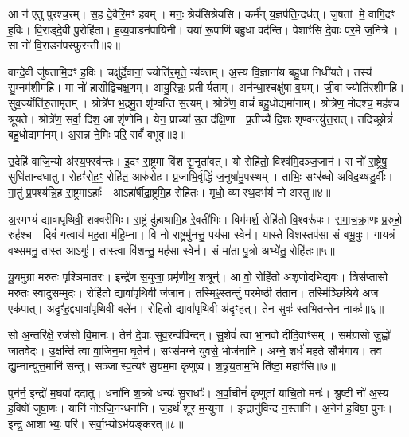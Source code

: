 आ न॑ एतु पुरश्च॒रम्।
स॒ह दे॒वैरि॒मꣳ हवम्।
मनः॒ श्रेय॑सिश्रेयसि।
कर्म॑न् य॒ज्ञप॑ति॒न्दध॑त्।
जु॒षतां मे॒ वागि॒दꣳ ह॒विः।
वि॒राड्दे॒वी पु॒रोहि॑ता।
ह॒व्य॒वाडन॑पायिनी।
यया॑ रू॒पाणि॑ बहु॒धा वद॑न्ति।
पेशाꣳ॑सि दे॒वाः प॑र॒मे ज॒नित्रे।
सा नो॑ वि॒राडन॑पस्फुरन्ती॥२॥

वाग्दे॒वी जु॑षतामि॒दꣳ ह॒विः।
चक्षु॑र्दे॒वानां॒ ज्योति॑र॒मृते॒ न्य॑क्तम्।
अ॒स्य वि॒ज्ञाना॑य बहु॒धा निधी॑यते।
तस्य॑ सु॒म्नम॑शीमहि।
मा नो॑ हासीद्विचक्ष॒णम्।
आयु॒रिन्नः॒ प्रतीर्यताम्।
अन॑न्धा॒श्चक्षु॑षा व॒यम्।
जी॒वा ज्योति॑रशीमहि।
सुव॒र्ज्योति॑रु॒तामृतम्।
श्रोत्रे॑ण भ॒द्रमु॒त शृ॑ण्वन्ति स॒त्यम्।
श्रोत्रे॑ण॒ वाचं॑ बहु॒धोद्यमा॑नाम्।
श्रोत्रे॑ण॒ मोद॑श्च॒ मह॑श्च श्रूयते।
श्रोत्रे॑ण॒ सर्वा॒ दिश॒ आ शृ॑णोमि।
येन॒ प्राच्या॑ उ॒त द॑क्षि॒णा।
प्र॒तीच्यै॑ दि॒शः शृ॒ण्वन्त्यु॑त्त॒रात्।
तदिच्छ्रोत्रं॑ बहु॒धोद्यमा॑नम्।
अ॒रान्न ने॒मिः परि॒ सर्वं॑ बभूव॥३॥\anuvakamend[अ॒ग्रि॒यमन॑पस्फुरन्ती स॒त्यꣳ स॒प्त च॑]

उ॒देहि॑ वाजि॒न्यो अ॑स्य॒फ्स्व॑न्तः।
इ॒दꣳ रा॒ष्ट्रमा वि॑श सू॒नृता॑वत्।
यो रोहि॑तो॒ विश्व॑मि॒दञ्ज॒जान॑।
स नो॑ रा॒ष्ट्रेषु॒ सुधि॑तान्दधातु।
रोहꣳ॑रोह॒ꣳ॒ रोहि॑त॒ आरु॑रोह।
प्र॒जाभि॒र्वृद्धिं॑ ज॒नुषा॑मु॒पस्थम्।
ताभिः॒ सꣳर॑ब्धो अविद॒थ्षडु॒र्वीः।
गा॒तुं प्र॒पश्य॑न्नि॒ह रा॒ष्ट्रमा\-ऽहाः᳚।
आऽहा॑र्\mbox{}षीद्रा॒ष्ट्रमि॒ह रोहि॑तः।
मृधो॒ व्यास्थ॒दभ॑यं नो अस्तु॥४॥

अ॒स्मभ्यं॑ द्यावापृथिवी॒ शक्व॑रीभिः।
रा॒ष्ट्रं दु॑हाथामि॒ह रे॒वती॑भिः।
विम॑मर्\mbox{}श॒ रोहि॑तो वि॒श्वरू॑पः।
स॒मा॒च॒क्रा॒णः प्र॒रुहो॒ रुह॑श्च।
दिवं॑ ग॒त्वाय॑ मह॒ता म॑हि॒म्ना।
वि नो॑ रा॒ष्ट्रमु॑नत्तु॒ पय॑सा॒ स्वेन॑।
यास्ते॒ विश॒स्तप॑सा सं बभू॒वुः।
गा॒य॒त्रं व॒थ्समनु॒ तास्त॒ आऽगुः॑।
तास्त्वा वि॑शन्तु॒ मह॑सा॒ स्वेन॑।
सं मा॑ता पु॒त्रो अ॒भ्ये॑तु॒ रोहि॑तः॥५॥

यू॒यमु॑ग्रा मरुतः पृश्ञिमातरः।
इन्द्रे॑ण स॒युजा॒ प्रमृ॑णीथ॒ शत्रून्॑।
आ वो॒ रोहि॑तो अशृणोदभिद्यवः।
त्रिस॑प्तासो मरुतः स्वादुसम्मुदः।
रोहि॑तो॒ द्यावा॑पृथि॒वी ज॑जान।
तस्मि॒ꣴ॒स्तन्तुं॑ परमे॒ष्ठी त॑तान।
तस्मि॑ञ्छिश्रिये अ॒ज एक॑पात्।
अदृꣳ॑ह॒द्द्यावा॑पृथि॒वी बले॑न।
रोहि॑तो॒ द्यावा॑पृथि॒वी अ॑दृꣳहत्।
तेन॒ सुवः॑ स्तभि॒तन्तेन॒ नाकः॑॥६॥

सो अ॒न्तरि॑क्षे॒ रज॑सो वि॒मानः॑।
तेन॑ दे॒वाः सुव॒रन्व॑विन्दन्।
सु॒शेवं॑ त्वा भा॒नवो॑ दीदि॒वाꣳसम्।
सम॑ग्रासो जु॒ह्वो॑ जातवेदः।
उ॒क्षन्ति॑ त्वा वा॒जिन॒मा घृ॒तेन॑।
सꣳस॑मग्ने युवसे॒ भोज॑नानि।
अग्ने॒ शर्ध॑ मह॒ते सौभ॑गाय।
तव॑ द्यु॒म्नान्यु॑त्त॒मानि॑ सन्तु।
सञ्जास्प॒त्यꣳ सु॒यम॒मा कृ॑णुष्व।
श॒त्रू॒य॒ताम॒भि ति॑ष्ठा॒ महाꣳ॑सि॥७॥\anuvakamend[अ॒स्त्वे॒तु॒ रोहि॑तो॒ नाको॒ महाꣳ॑सि]

पुन॑र्न॒ इन्द्रो॑ म॒घवा॑ ददातु।
धना॑नि श॒क्रो धन्यः॑ सु॒राधाः᳚।
अ॒र्वा॒चीनं॑ कृणुतां याचि॒तो मनः॑।
श्रु॒ष्टी नो॑ अ॒स्य ह॒विषो॑ जुषा॒णः।
यानि॑ नोऽजि॒नन्धना॑नि।
ज॒हर्थ॑ शूर म॒न्युना।
इन्द्रानु॑विन्द न॒स्तानि॑।
अ॒नेन॑ ह॒विषा॒ पुनः॑।
इन्द्र॒ आशाभ्यः॒ परि॑।
सर्वा॒भ्यो\-ऽभ॑यङ्करत्॥८॥

